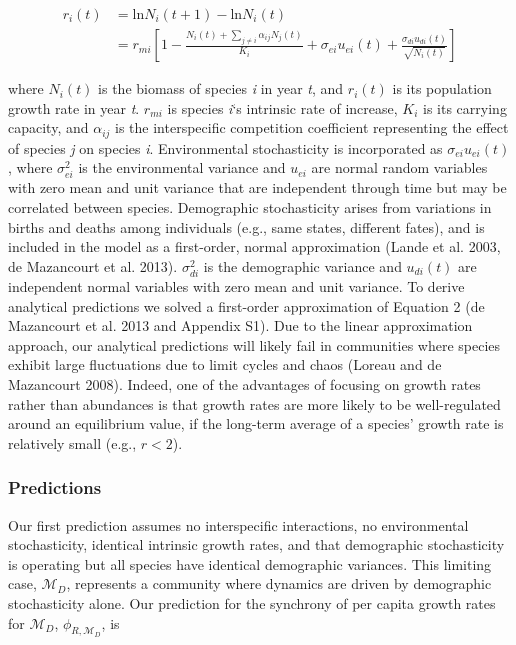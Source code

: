 \documentclass[12pt,]{article}
\begin{document}
\begin{align}
r_i(t) &= \text{ln}N_i(t+1) - \text{ln}N_i(t) \\
&= r_{mi} \left[ 1- \frac{N_i(t)+\sum_{j \neq i} \alpha_{ij}N_j(t)} {K_i} + \sigma_{ei}u_{ei}(t) + \frac{\sigma_{di}u_{di}(t)}{\sqrt{N_i(t)}} \right]
\end{align}

\noindent where \(N_i(t)\) is the biomass of species \emph{i} in year
\emph{t}, and \(r_i(t)\) is its population growth rate in year \emph{t}.
\(r_{mi}\) is species \emph{i}`s intrinsic rate of increase, \(K_i\) is
its carrying capacity, and \(\alpha_{ij}\) is the interspecific
competition coefficient representing the effect of species \emph{j} on
species \emph{i}. Environmental stochasticity is incorporated as
\(\sigma_{ei}u_{ei}(t)\), where \(\sigma_{ei}^2\) is the environmental
variance and \(u_{ei}\) are normal random variables with zero mean and
unit variance that are independent through time but may be correlated
between species. Demographic stochasticity arises from variations in
births and deaths among individuals (e.g., same states, different
fates), and is included in the model as a first-order, normal
approximation (Lande et al. 2003, {{de Mazancourt}} et al. 2013).
\(\sigma_{di}^2\) is the demographic variance and \(u_{di}(t)\) are
independent normal variables with zero mean and unit variance. To derive
analytical predictions we solved a first-order approximation of Equation
2 ({{de Mazancourt}} et al. 2013 and Appendix S1). Due to the linear
approximation approach, our analytical predictions will likely fail in
communities where species exhibit large fluctuations due to limit cycles
and chaos (Loreau and {{de Mazancourt}} 2008). Indeed, one of the
advantages of focusing on growth rates rather than abundances is that
growth rates are more likely to be well-regulated around an equilibrium
value, if the long-term average of a species' growth rate is relatively
small (e.g., \(r < 2\)).

\subsubsection{Predictions}\label{predictions}

Our first prediction assumes no interspecific interactions, no
environmental stochasticity, identical intrinsic growth rates, and that
demographic stochasticity is operating but all species have identical
demographic variances. This limiting case, \(\mathcal{M}_{D}\),
represents a community where dynamics are driven by demographic
stochasticity alone. Our prediction for the synchrony of per capita
growth rates for \(\mathcal{M}_{D}\), \(\phi_{R,\mathcal{M}_{D}}\), is
\end{document}
